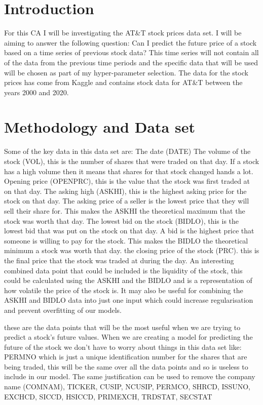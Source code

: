 \documentclass{report}
\begin{document}
\section{Introduction}
For this CA I will be investigating the AT\&T stock prices data set.
I will be aiming to answer the following question: Can I predict the future price of a stock based on a time series of previous stock data?
This time series will not contain all of the data from the previous time periods and the specific data that will be used will be chosen as part of my hyper-parameter selection.
The data for the stock prices has come from Kaggle and contains stock data for AT\&T between the years 2000 and 2020.

\section{Methodology and Data set}
Some of the key data in this data set are: The date (DATE)
The volume of the stock (VOL), this is the number of shares that were traded on that day. If a stock has a high volume then it means that shares for that stock changed hands a lot.
Opening price (OPENPRC), this is the value that the stock was first traded at on that day.
The asking high (ASKHI), this is the highest asking price for the stock on that day. The asking price of a seller is the lowest price that they will sell their share for. This makes the ASKHI the theoretical maximum that the stock was worth that day.
The lowest bid on the stock (BIDLO), this is the lowest bid that was put on the stock on that day. A bid is the highest price that someone is willing to pay for the stock. This makes the BIDLO the theoretical minimum a stock was worth that day.
the closing price of the stock (PRC). this is the final price that the stock was traded at during the day.
An interesting combined data point that could be included is the liquidity of the stock, this could be calculated using the ASKHI and the BIDLO and is a representation of how volatile the price of the stock is. It may also be useful for combining the ASKHI and BIDLO data into just one input which could increase regularisation and prevent overfitting of our models.

these are the data points that will be the most useful when we are trying to predict a stock's future values.
When we are creating a model for predicting the future of the stock we don't have to worry about things in this data set like:
PERMNO which is just a unique identification number for the shares that are being traded, this will be the same over all the data points and so is useless to include in our model.
The same justification can be used to remove the company name (COMNAM), TICKER, CUSIP, NCUSIP, PERMCO, SHRCD, ISSUNO, EXCHCD, SICCD, HSICCD, PRIMEXCH, TRDSTAT, SECSTAT
\end{document}
